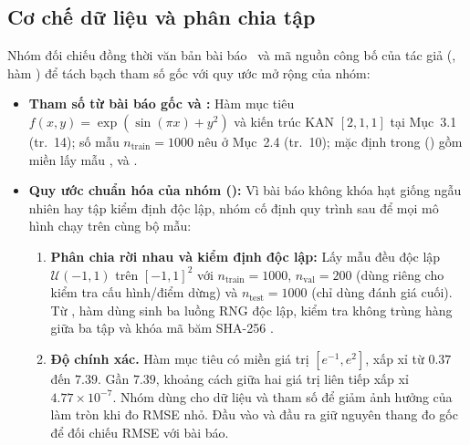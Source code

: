 \subsection{Cơ chế dữ liệu và phân chia tập}
\label{sec:tv1-data-mechanism}
Nhóm đối chiếu đồng thời văn bản bài báo~\cite{liu2025kan} và mã nguồn công bố của tác giả (, hàm ) để tách bạch tham số gốc với quy ước mở rộng của nhóm:
\begin{itemize}
\item \textbf{Tham số từ bài báo gốc và :} Hàm mục tiêu $f(x,y)=\exp(\sin(\pi x)+y^2)$ và kiến trúc KAN $[2,1,1]$ tại Mục~3.1 (tr.~14); số mẫu $n_{\mathrm{train}} = 1000$ nêu ở Mục~2.4 (tr.~10); mặc định trong  () gồm miền lấy mẫu ,  và .
\item \textbf{Quy ước chuẩn hóa của nhóm ():} Vì bài báo không khóa hạt giống ngẫu nhiên hay tập kiểm định độc lập, nhóm cố định quy trình sau để mọi mô hình chạy trên cùng bộ mẫu:
  \begin{enumerate}
  \item \textbf{Phân chia rời nhau và kiểm định độc lập:} Lấy mẫu đều độc lập $\mathcal{U}(-1,1)$ trên $[-1,1]^2$ với $n_{\mathrm{train}} = 1000$, $n_{\mathrm{val}} = 200$ (dùng riêng cho kiểm tra cấu hình/điểm dừng) và $n_{\mathrm{test}} = 1000$ (chỉ dùng đánh giá cuối). Từ , hàm  dùng  sinh ba luồng RNG độc lập, kiểm tra không trùng hàng giữa ba tập và khóa mã băm SHA-256 .
  \item \textbf{Độ chính xác.} Hàm mục tiêu có miền giá trị $[e^{-1}, e^2]$, xấp xỉ từ $0.37$ đến $7.39$. Gần $7.39$, khoảng cách giữa hai giá trị  liên tiếp xấp xỉ $4.77\times 10^{-7}$. Nhóm dùng  cho dữ liệu và tham số để giảm ảnh hưởng của làm tròn khi đo RMSE nhỏ. Đầu vào và đầu ra giữ nguyên thang đo gốc để đối chiếu RMSE với bài báo.
  \end{enumerate}
\end{itemize}


